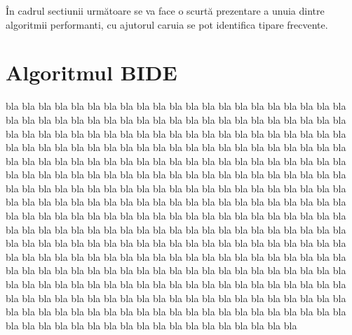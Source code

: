 În cadrul sectiunii următoare se va face o scurtă prezentare a unuia dintre algoritmii performanti, cu ajutorul caruia se pot identifica tipare frecvente. 




\section{Algoritmul BIDE}

bla bla bla bla bla bla bla bla bla bla bla bla bla bla bla bla bla bla bla bla bla bla bla bla bla bla bla bla bla bla bla bla bla bla bla bla bla bla bla bla bla bla bla bla bla bla bla bla bla bla bla bla bla bla bla bla bla bla bla bla bla bla bla bla bla bla bla bla bla bla bla bla bla bla bla bla bla bla bla bla bla bla bla bla bla bla bla bla bla bla bla bla bla bla bla bla bla bla bla bla bla bla bla bla bla bla bla bla bla bla bla bla bla bla bla bla bla bla bla bla bla bla bla bla bla bla bla bla bla bla bla bla bla bla bla bla bla bla bla bla bla bla bla bla bla bla bla bla bla bla bla bla bla bla bla bla bla bla bla bla bla bla bla bla bla bla bla bla bla bla bla bla bla bla bla bla bla bla bla bla bla bla bla bla bla bla bla bla bla bla bla bla bla bla bla bla bla bla bla bla bla bla bla bla bla bla bla bla bla bla bla bla bla bla bla bla bla bla bla bla bla bla bla bla bla bla bla bla bla bla bla bla bla bla bla bla bla bla bla bla bla bla bla bla bla bla bla bla bla bla bla bla bla bla bla bla bla bla bla bla bla bla bla bla bla bla bla bla bla bla bla bla bla bla bla bla bla bla bla bla bla bla bla bla bla bla bla bla bla bla bla bla bla bla bla bla bla bla bla bla bla bla bla bla bla bla bla bla bla bla bla bla bla bla bla bla bla bla bla bla bla bla bla bla bla bla bla bla bla bla bla bla bla bla bla bla bla bla bla bla bla bla bla bla bla bla bla bla bla bla bla bla bla bla 